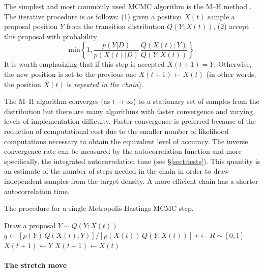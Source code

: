 \documentclass[12pt,preprint]{aastex}
\newcommand{\sect}[1]{\S\ref{sect:#1}}
\newcommand{\algo}[1]{Algorithm \ref{algo:#1}}
\newcommand{\algolabel}[1]{\label{algo:#1}}
\renewcommand{\vector}[1]{#1}
\newcommand{\pr}[1]{\ensuremath{p(#1)}}
\newcommand{\data}{\ensuremath{\vector{D}}}
\begin{document}
The simplest and most commonly used MCMC algorithm is the M--H method
\citep[\algo{mh};][]{MacKay:2003,Gregory:2005,Press:2007,Hogg:2010}.
The iterative procedure is as follows: (1) given a position
$X(t)$ sample a proposal position $Y$ from the transition distribution
$Q(Y; X(t))$, (2) accept this proposal with probability
\begin{equation}
    \mathrm{min} \left \{ 1,
            \frac{\pr{\vector{Y} | \data}}{\pr{\vector{X}(t) | \data}} \,
            \frac{Q(X(t); Y)}{ Q(Y;X(t))}  \right \}.
\end{equation}
It is worth emphasizing that if this step is accepted $X(t+1) = Y$; Otherwise,
the new position is set to the previous one $X(t+1) \gets X(t)$ (in other
words, the position $X(t)$ is \emph{repeated in the chain}).

The M--H algorithm converges (as $t \to \infty$) to a stationary set of
samples from the distribution but there are many algorithms with faster
convergence and varying levels of implementation difficulty.
Faster convergence is preferred because of the reduction of computational
cost due to the smaller number of likelihood computations necessary to obtain
the equivalent level of accuracy. The inverse convergence rate can be
measured by the autocorrelation function and more specifically, the integrated
autocorrelation time (see \sect{tests}). This quantity is an estimate of the
number of steps needed in the chain in order to draw independent samples from
the target density. A more efficient chain has a shorter
autocorrelation time.

\begin{algorithm}
\caption{The procedure for a single Metropolis-Hastings MCMC step.
    \algolabel{mh}}
\begin{algorithmic}[1]

\STATE Draw a proposal $Y \sim Q (Y; X(t))$
\STATE $q \gets [\pr{\vector{Y}} \, Q(X(t); Y)]
        / [\pr{\vector{X}(t)} \, Q(Y;X(t))]$%
            \hspace{1cm}{\footnotesize\it // This line is generally expensive}
\STATE $r \gets R \sim [0, 1]$
    \STATE $\vector{X}(t+1) \gets \vector{Y}$
\ELSE
    \STATE $\vector{X}(t+1) \gets \vector{X}(t)$
\ENDIF

\end{algorithmic}
\end{algorithm}

\paragraph{The stretch move}
\end{document}
